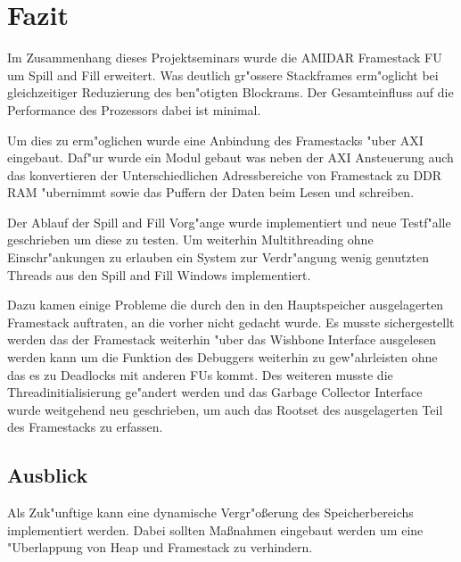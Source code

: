 \chapter{Fazit}
\label{cha:Fazit}

Im Zusammenhang dieses Projektseminars wurde die AMIDAR Framestack FU um Spill and Fill erweitert. Was deutlich gr"o{ss}ere Stackframes erm"oglicht bei gleichzeitiger Reduzierung des ben"otigten Blockrams. Der Gesamteinfluss auf die Performance des Prozessors dabei ist minimal. 

Um dies zu erm"oglichen wurde eine Anbindung des Framestacks "uber AXI eingebaut. Daf"ur wurde ein Modul gebaut was neben der AXI Ansteuerung auch das konvertieren der Unterschiedlichen Adressbereiche von Framestack zu DDR RAM "ubernimmt sowie das Puffern der Daten beim Lesen und schreiben.  

Der Ablauf der Spill and Fill Vorg"ange wurde implementiert und neue Testf"alle geschrieben um diese zu testen. 
Um weiterhin Multithreading ohne Einschr"ankungen zu erlauben ein System zur Verdr"angung wenig genutzten Threads aus den Spill and Fill Windows implementiert. 

Dazu kamen einige Probleme die durch den in den Hauptspeicher ausgelagerten Framestack auftraten, an die vorher nicht gedacht wurde. 
Es musste sichergestellt werden das der Framestack weiterhin "uber das Wishbone Interface ausgelesen werden kann um die Funktion des Debuggers weiterhin zu gew"ahrleisten ohne das es zu Deadlocks mit anderen FUs kommt. Des weiteren musste die Threadinitialisierung ge"andert werden und das Garbage Collector Interface wurde weitgehend neu geschrieben, um auch das Rootset des ausgelagerten Teil des Framestacks zu erfassen.  

\section{Ausblick}

Als Zuk"unftige kann eine dynamische Vergr"oßerung des Speicherbereichs implementiert werden. Dabei sollten Maßnahmen eingebaut werden um eine "Uberlappung von Heap und Framestack zu verhindern.